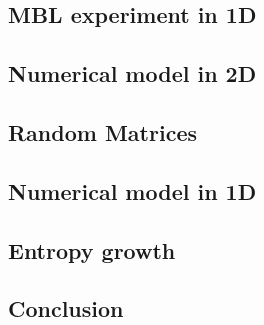 




\subsection{MBL experiment in 1D}






\subsection{Numerical model in 2D}






\subsection{Random Matrices}






\subsection{Numerical model in 1D}





\subsection{Entropy growth}






\subsection{Conclusion}







